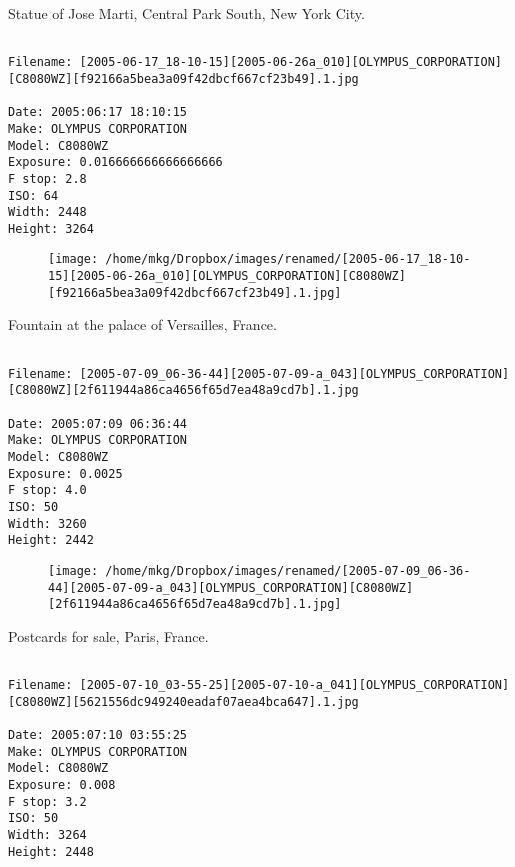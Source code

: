 \clearpage
\onecolumn
\noindent Statue of Jose Marti, Central Park South, New York City.
\noindent
\begin{lstlisting}

Filename: [2005-06-17_18-10-15][2005-06-26a_010][OLYMPUS_CORPORATION][C8080WZ][f92166a5bea3a09f42dbcf667cf23b49].1.jpg

Date: 2005:06:17 18:10:15
Make: OLYMPUS CORPORATION
Model: C8080WZ
Exposure: 0.016666666666666666
F stop: 2.8
ISO: 64
Width: 2448
Height: 3264
\end{lstlisting}
\clearpage

\begin{figure}
\texttt{[image: /home/mkg/Dropbox/images/renamed/[2005-06-17\_18-10-15][2005-06-26a\_010][OLYMPUS\_CORPORATION][C8080WZ][f92166a5bea3a09f42dbcf667cf23b49].1.jpg]}
\end{figure}
    
\clearpage
\onecolumn
\noindent Fountain at the palace of Versailles, France.
\noindent
\begin{lstlisting}

Filename: [2005-07-09_06-36-44][2005-07-09-a_043][OLYMPUS_CORPORATION][C8080WZ][2f611944a86ca4656f65d7ea48a9cd7b].1.jpg

Date: 2005:07:09 06:36:44
Make: OLYMPUS CORPORATION
Model: C8080WZ
Exposure: 0.0025
F stop: 4.0
ISO: 50
Width: 3260
Height: 2442
\end{lstlisting}
\clearpage

\begin{figure}
\texttt{[image: /home/mkg/Dropbox/images/renamed/[2005-07-09\_06-36-44][2005-07-09-a\_043][OLYMPUS\_CORPORATION][C8080WZ][2f611944a86ca4656f65d7ea48a9cd7b].1.jpg]}
\end{figure}
    
\clearpage
\onecolumn
\noindent Postcards for sale, Paris, France.
\noindent
\begin{lstlisting}

Filename: [2005-07-10_03-55-25][2005-07-10-a_041][OLYMPUS_CORPORATION][C8080WZ][5621556dc949240eadaf07aea4bca647].1.jpg

Date: 2005:07:10 03:55:25
Make: OLYMPUS CORPORATION
Model: C8080WZ
Exposure: 0.008
F stop: 3.2
ISO: 50
Width: 3264
Height: 2448
\end{lstlisting}
\clearpage

